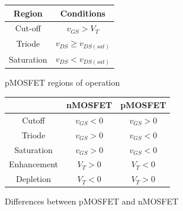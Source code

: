 \documentclass[nobib]{tufte-handout}
\begin{document}
\begin{figure}
    \begin{center}
        \begin{tabular}{ c | c }
            Region & Conditions \\
            \hline
            Cut-off & $v_{GS} > V_T$ \\
            Triode & $v_{DS} \geq v_{DS(sat)}$ \\
            Saturation & $v_{DS} < v_{DS(sat)}$ \\
            \hline
        \end{tabular}
    \end{center}
    \caption{pMOSFET regions of operation}
    \label{tab:pMOSFET regions}
\end{figure}

\begin{figure}
    \begin{center}
        \begin{tabular}{ c | c | c }
            & nMOSFET & pMOSFET \\
            \hline
            Cutoff & $v_{GS} < 0$ & $v_{GS} > 0$ \\
            Triode & $v_{GS} > 0$ & $v_{GS} < 0$ \\
            Saturation & $v_{GS} > 0$ & $v_{GS} < 0$ \\
            \hline
            Enhancement & $V_T > 0$ & $V_T < 0$ \\
            Depletion & $V_T < 0$ & $V_T > 0$ \\
            \hline
        \end{tabular}
    \end{center}
    \caption{Differences between pMOSFET and nMOSFET}
    \label{tab:pn differences}
\end{figure}
\end{document}
